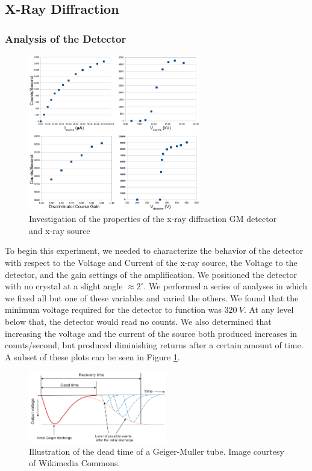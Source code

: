 \documentclass[%
 reprint,
 amsmath,amssymb,
 aps,
 pra,
]{revtex4-1}
\begin{document}
\subsection{X-Ray Diffraction}

\subsubsection{Analysis of the Detector}

\begin{figure}[H]
	\centering
	\includegraphics[width=7.5cm]{xrd_setup_investigation.png}
	\caption{Investigation of the properties of the x-ray diffraction GM detector and x-ray source}
	\label{fig:xrf_setup_investigation}
\end{figure}

To begin this experiment, we needed to characterize the behavior of the detector with respect to the Voltage and Current of the x-ray source, the Voltage to the detector, and the gain settings of the amplification. We positioned the detector with no crystal at a slight angle $\approx 2^\circ$. We performed a series of analyses in which we fixed all but one of these variables and varied the others. We found that the minimum voltage required for the detector to function was $320~V$. At any level below that, the detector would read no counts. We also determined that increasing the voltage and the current of the source both produced increases in counts/second, but produced diminishing returns after a certain amount of time. A subset of these plots can be seen in Figure \ref{fig:xrf_setup_investigation}.

\begin{figure}[H]
	\centering
	\includegraphics[width=6cm]{dead_time.png}
	\caption{Illustration of the dead time of a Geiger-Muller tube. Image courtesy of Wikimedia Commons.}
	\label{fig:dead_time}
\end{figure}
\end{document}
